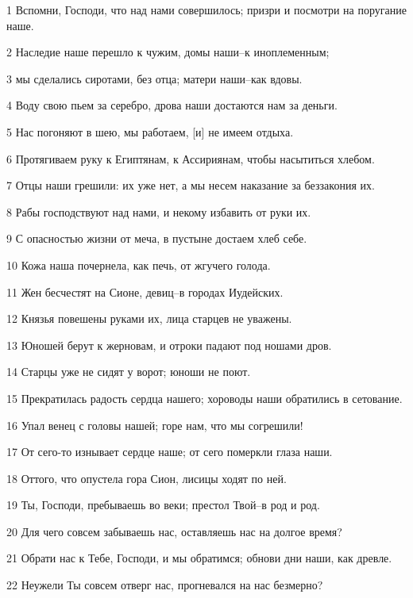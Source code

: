 \par 1 Вспомни, Господи, что над нами совершилось; призри и посмотри на поругание наше.
\par 2 Наследие наше перешло к чужим, домы наши--к иноплеменным;
\par 3 мы сделались сиротами, без отца; матери наши--как вдовы.
\par 4 Воду свою пьем за серебро, дрова наши достаются нам за деньги.
\par 5 Нас погоняют в шею, мы работаем, [и] не имеем отдыха.
\par 6 Протягиваем руку к Египтянам, к Ассириянам, чтобы насытиться хлебом.
\par 7 Отцы наши грешили: их уже нет, а мы несем наказание за беззакония их.
\par 8 Рабы господствуют над нами, и некому избавить от руки их.
\par 9 С опасностью жизни от меча, в пустыне достаем хлеб себе.
\par 10 Кожа наша почернела, как печь, от жгучего голода.
\par 11 Жен бесчестят на Сионе, девиц--в городах Иудейских.
\par 12 Князья повешены руками их, лица старцев не уважены.
\par 13 Юношей берут к жерновам, и отроки падают под ношами дров.
\par 14 Старцы уже не сидят у ворот; юноши не поют.
\par 15 Прекратилась радость сердца нашего; хороводы наши обратились в сетование.
\par 16 Упал венец с головы нашей; горе нам, что мы согрешили!
\par 17 От сего-то изнывает сердце наше; от сего померкли глаза наши.
\par 18 Оттого, что опустела гора Сион, лисицы ходят по ней.
\par 19 Ты, Господи, пребываешь во веки; престол Твой--в род и род.
\par 20 Для чего совсем забываешь нас, оставляешь нас на долгое время?
\par 21 Обрати нас к Тебе, Господи, и мы обратимся; обнови дни наши, как древле.
\par 22 Неужели Ты совсем отверг нас, прогневался на нас безмерно?


